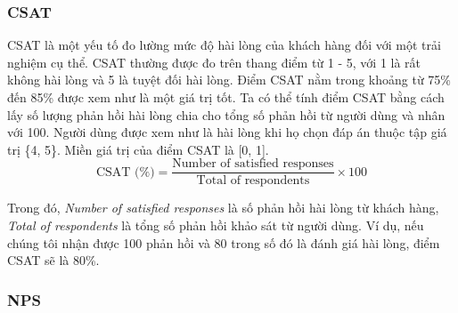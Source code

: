 \subsubsection{CSAT}

CSAT là một yếu tố đo lường mức độ hài lòng của khách hàng đối với một trải nghiệm cụ thể. CSAT thường được đo trên thang điểm từ 1 - 5, với 1 là rất không hài lòng và 5 là tuyệt đối hài lòng. Điểm CSAT nằm trong khoảng từ 75\% đến 85\% được xem như là một giá trị tốt. Ta có thể tính điểm CSAT bằng cách lấy số lượng phản hồi hài lòng chia cho tổng số phản hồi từ người dùng và nhân với 100. Người dùng được xem như là hài lòng khi họ chọn đáp án thuộc tập giá trị \{4, 5\}. Miền giá trị của điểm CSAT là [0, 1].
\[ \text{CSAT (\%)} = \frac{\text{Number of satisfied responses}}{\text{Total of respondents}} \times 100 \]
\par
Trong đó, \emph{Number of satisfied responses} là số phản hồi hài lòng từ khách hàng, \emph{Total of respondents} là tổng số phản hồi khảo sát từ người dùng. Ví dụ, nếu chúng tôi nhận được 100 phản hồi và 80 trong số đó là đánh giá hài lòng, điểm CSAT sẽ là 80\%.

\subsubsection{NPS}

